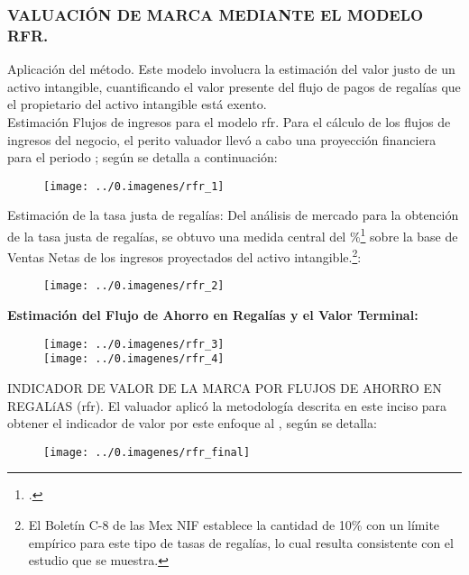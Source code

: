 \subsubsection{VALUACIÓN  DE MARCA MEDIANTE EL MODELO RFR.}

\textcolor{principal}{Aplicación del método}. Este modelo involucra la estimación del valor justo de un activo intangible, cuantificando el valor presente del flujo de pagos de regalías que el propietario del activo intangible está exento.\\

\textcolor{principal}{Estimación Flujos de ingresos para el modelo \gls{rfr}}. Para el cálculo de los flujos de ingresos del negocio, el perito valuador llevó a cabo una proyección financiera para el periodo \periodoProyeccion; según se detalla a continuación:

\begin{figure}[H]
\centering
\texttt{[image: ../0.imagenes/rfr\_1]}
\end{figure}

\textcolor{principal}{Estimación de la tasa justa de regalías:} Del análisis de mercado para la obtención de la tasa justa de regalías, se obtuvo una medida central del \tasaRegalias\%\footnote{\estadisticoTasaRegalias.} sobre la base de Ventas Netas de los ingresos proyectados del activo intangible.\footnote{ El Boletín C-8 de las Mex NIF establece la cantidad de 10\% con un límite empírico para este tipo de tasas de regalías, lo cual resulta consistente con el estudio que se muestra.}:

\begin{figure}[H]
\centering
\texttt{[image: ../0.imagenes/rfr\_2]}
\end{figure}

\textcolor{principal}{\textbf{Estimación del Flujo de Ahorro en Regalías y el Valor Terminal:}}

\begin{figure}[H]
\centering
\texttt{[image: ../0.imagenes/rfr\_3]}\\[10pt]

\texttt{[image: ../0.imagenes/rfr\_4]}
\end{figure}

\espacio{1cm}

\textcolor{principal}{INDICADOR DE VALOR DE LA MARCA POR FLUJOS DE AHORRO EN REGALíAS (\gls{rfr})}. El valuador aplicó la metodología descrita en este inciso para obtener el indicador de valor por este enfoque al \textcolor{principal}{\fechaValores}, según se detalla:



\begin{figure}[H]
\centering
\texttt{[image: ../0.imagenes/rfr\_final]}
\end{figure}

